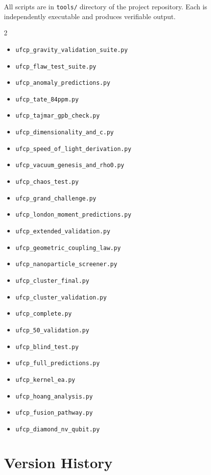 \documentclass[11pt, a4paper]{article}
\begin{document}
All scripts are in \texttt{tools/} directory of the project
repository. Each is independently executable and produces
verifiable output.

\begin{multicols}{2}
\begin{itemize}[nosep, leftmargin=*]
  \item \texttt{ufcp\_gravity\_validation\_suite.py}
  \item \texttt{ufcp\_flaw\_test\_suite.py}
  \item \texttt{ufcp\_anomaly\_predictions.py}
  \item \texttt{ufcp\_tate\_84ppm.py}
  \item \texttt{ufcp\_tajmar\_gpb\_check.py}
  \item \texttt{ufcp\_dimensionality\_and\_c.py}
  \item \texttt{ufcp\_speed\_of\_light\_derivation.py}
  \item \texttt{ufcp\_vacuum\_genesis\_and\_rho0.py}
  \item \texttt{ufcp\_chaos\_test.py}
  \item \texttt{ufcp\_grand\_challenge.py}
  \item \texttt{ufcp\_london\_moment\_predictions.py}
  \item \texttt{ufcp\_extended\_validation.py}
  \item \texttt{ufcp\_geometric\_coupling\_law.py}
  \item \texttt{ufcp\_nanoparticle\_screener.py}
  \item \texttt{ufcp\_cluster\_final.py}
  \item \texttt{ufcp\_cluster\_validation.py}
  \item \texttt{ufcp\_complete.py}
  \item \texttt{ufcp\_50\_validation.py}
  \item \texttt{ufcp\_blind\_test.py}
  \item \texttt{ufcp\_full\_predictions.py}
  \item \texttt{ufcp\_kernel\_ea.py}
  \item \texttt{ufcp\_hoang\_analysis.py}
  \item \texttt{ufcp\_fusion\_pathway.py}
  \item \texttt{ufcp\_diamond\_nv\_qubit.py}
\end{itemize}
\end{multicols}

\section{Version History}
\end{document}
